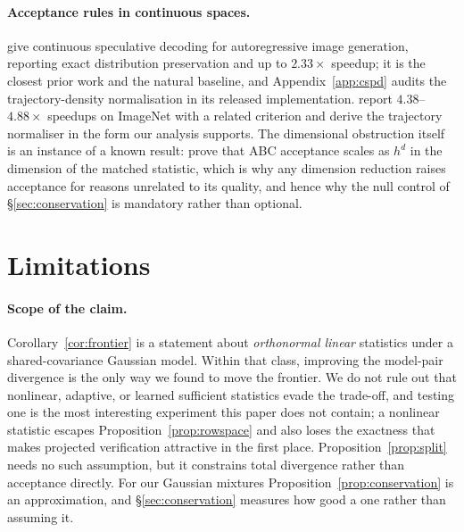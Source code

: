 \documentclass[10pt]{article}
\newcommand{\dd}{d}
\begin{document}
\paragraph{Acceptance rules in continuous spaces.} \citet{wang2025continuous} give continuous
speculative decoding for autoregressive image generation, reporting exact distribution preservation
and up to $2.33\times$ speedup; it is the closest prior work and the natural baseline, and
Appendix~\ref{app:cspd} audits the trajectory-density normalisation in its released implementation.
\citet{zhang2025fastardiff} report $4.38$--$4.88\times$ speedups on ImageNet with a related criterion
and derive the trajectory normaliser in the form our analysis supports. The dimensional obstruction
itself is an instance of a known result: \citet{fearnhead2012constructing}
prove that ABC acceptance scales as $h^\dd$ in the dimension of the matched statistic, which is why
any dimension reduction raises acceptance for reasons unrelated to its quality, and hence why the null
control of \S\ref{sec:conservation} is mandatory rather than optional.

\section{Limitations}
\label{sec:limits}

\paragraph{Scope of the claim.} Corollary~\ref{cor:frontier} is a statement about \emph{orthonormal
linear} statistics under a shared-covariance Gaussian model. Within that class, improving the
model-pair divergence is the only way we found to move the frontier. We do not rule out that
nonlinear, adaptive, or learned sufficient statistics evade the trade-off, and testing one is the
most interesting experiment this paper does not contain; a nonlinear statistic escapes
Proposition~\ref{prop:rowspace} and also loses the exactness that makes projected verification
attractive in the first place. Proposition~\ref{prop:split} needs no such assumption, but it
constrains total divergence rather than acceptance directly. For our Gaussian mixtures
Proposition~\ref{prop:conservation} is an approximation, and \S\ref{sec:conservation} measures how
good a one rather than assuming it.
\end{document}
